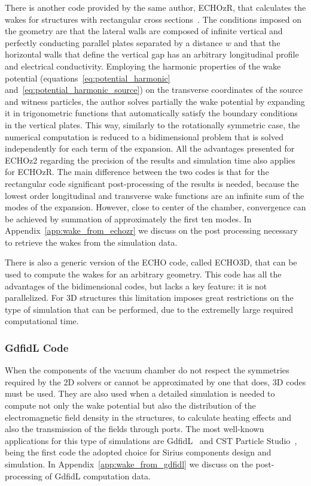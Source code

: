     There is another code provided by the same author, ECHOzR, that calculates the wakes for structures with rectangular cross sections~\cite{Zagorodnov2015}. The conditions imposed on the geometry are that the lateral walls are composed of infinite vertical and perfectly conducting parallel plates separated by a distance $w$ and that the horizontal walls that define the vertical gap has an arbitrary longitudinal profile and electrical conductivity. Employing the harmonic properties of the wake potential (equations~\eqref{eq:potential_harmonic} and~\eqref{eq:potential_harmonic_source}) on the transverse coordinates of the source and witness particles, the author solves partially the wake potential by expanding it in trigonometric functions that automatically satisfy the boundary conditions in the vertical plates. This way, similarly to the rotationally symmetric case, the numerical computation is reduced to a bidimensional problem that is solved independently for each term of the expansion. All the advantages presented for ECHOz2 regarding the precision of the results and simulation time also applies for ECHOzR. The main difference between the two codes is that for the rectangular code significant post-processing of the results is needed, because the lowest order longitudinal and transverse wake functions are an infinite sum of the modes of the expansion. However, close to center of the chamber, convergence can be achieved by summation of approximately the first ten modes. In Appendix~\ref{app:wake_from_echozr} we discuss on the post processing necessary to retrieve the wakes from the simulation data.

    There is also a generic version of the ECHO code, called ECHO3D, that can be used to compute the wakes for an arbitrary geometry. This code has all the advantages of the bidimensional codes, but lacks a key feature: it is not parallelized. For 3D structures this limitation imposes great restrictions on the type of simulation that can be performed, due to the extremelly large required computational time.

\subsubsection{GdfidL Code}

    When the components of the vacuum chamber do not respect the symmetries required by the 2D solvers or cannot be approximated by one that does, 3D codes must be used. They are also used when a detailed simulation is needed to compute not only the wake potential but also the distribution of the electromagnetic field density in the structures, to calculate heating effects and also the transmission of the fields through ports. The most well-known applications for this type of simulations are GdfidL~\cite{Bruns1997, Bruns2017} and CST Particle Studio~\cite{CST2017}, being the first code the adopted choice for Sirius components design and simulation. In Appendix~\ref{app:wake_from_gdfidl} we discuss on the post-processing of GdfidL computation data.


